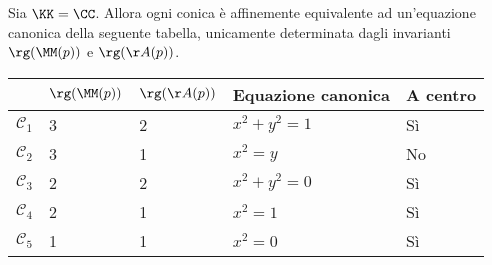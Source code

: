 \documentclass[11pt]{article}
\begin{document}
	\hr
	
	\begin{theorem} 
		Sia $\KK=\CC$. Allora ogni conica è affinemente equivalente ad
		un'equazione canonica della seguente tabella, unicamente
		determinata dagli invarianti $\rg(\MM(p))$ e $\rg(\AA(p))$.
		
		\begin{center}
			\begin{tabular}{|l|l|l|l|l|}
				\hline
				& $\rg(\MM(p))$ & $\rg(\AA(p))$ & Equazione canonica & A centro \\ \hline
				$\mathcal{C}_1$ & 3             & 2             & $x^2+y^2=1$        & Sì       \\ \hline
				$\mathcal{C}_2$ & 3             & 1             & $x^2=y$            & No       \\ \hline
				$\mathcal{C}_3$ & 2             & 2             & $x^2+y^2=0$        & Sì       \\ \hline
				$\mathcal{C}_4$ & 2             & 1             & $x^2=1$          & Sì       \\ \hline
				$\mathcal{C}_5$ & 1             & 1             & $x^2=0$            & Sì       \\ \hline
			\end{tabular}
		\end{center}
	\end{theorem}

	\vskip 0.01in
\end{document}

